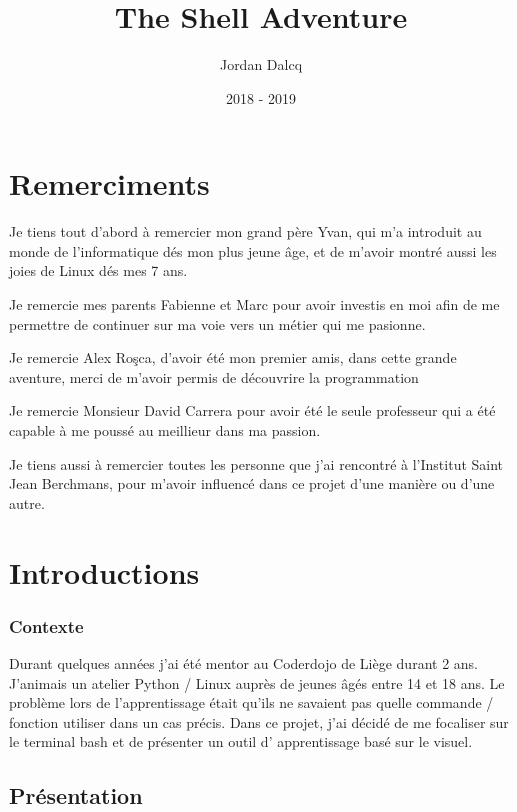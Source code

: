 \documentclass{report}
\title{The Shell Adventure}
\author{Jordan Dalcq}
\date{2018 - 2019}
\begin{document}
\maketitle
\tableofcontents

\pagestyle{empty}

\part*{Remerciments}

Je tiens tout d'abord à remercier mon grand père Yvan, qui m'a introduit au monde de l'informatique dés mon plus jeune âge, et de m'avoir montré aussi les joies de Linux dés mes 7 ans.
\newline
\par Je remercie mes parents Fabienne et Marc pour avoir investis en moi afin de me permettre de continuer sur ma voie vers un métier qui me pasionne.
\newline
\par Je remercie Alex Roşca, d'avoir été mon premier amis, dans cette grande aventure, merci de m'avoir permis de découvrire la programmation
\newline
\par Je remercie Monsieur David Carrera pour avoir été le seule professeur qui a été capable à me poussé au meillieur dans ma passion.
\newline
\par Je tiens aussi à remercier toutes les personne que j'ai rencontré à l'Institut Saint Jean Berchmans, pour m'avoir influencé dans ce projet d'une manière ou d'une autre.

\part{Introductions}

\section*{Contexte}
Durant quelques années j’ai été mentor au Coderdojo de Liège durant 2 ans. J’animais un atelier Python / Linux auprès de jeunes âgés entre 14 et 18 ans. Le problème lors de l’apprentissage était qu’ils ne savaient pas quelle commande / fonction utiliser dans un cas précis. Dans ce projet, j’ai décidé de me focaliser sur le terminal bash et de présenter un outil d’ apprentissage basé sur le visuel.
\chapter{Présentation}
\end{document}
